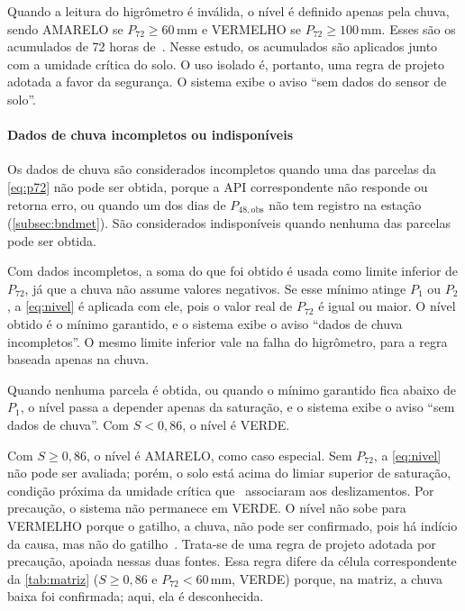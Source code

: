 Quando a leitura do higrômetro é inválida, o nível é definido apenas pela chuva, sendo AMARELO se $P_{72} \geq 60$\,mm e VERMELHO se
$P_{72} \geq 100$\,mm. Esses são os acumulados de 72 horas de~.
Nesse estudo, os acumulados são aplicados junto com a umidade crítica
do solo. O uso isolado é, portanto, uma regra de projeto adotada a
favor da segurança. O sistema exibe o aviso ``sem dados do sensor de
solo''.

\paragraph*{Dados de chuva incompletos ou indisponíveis}

Os dados de chuva são considerados incompletos quando uma das parcelas
da \autoref{eq:p72} não pode ser obtida, porque a API correspondente não
responde ou retorna erro, ou quando um dos dias de
$P_{48,\mathrm{obs}}$ não tem registro na estação
(\autoref{subsec:bndmet}). São considerados indisponíveis quando nenhuma
das parcelas pode ser obtida.

Com dados incompletos, a soma do que foi obtido é usada como limite
inferior de $P_{72}$, já que a chuva não assume valores negativos. Se
esse mínimo atinge $P_1$ ou $P_2$, a \autoref{eq:nivel} é aplicada com
ele, pois o valor real de $P_{72}$ é igual ou maior.
O nível obtido é o mínimo garantido, e o sistema exibe o aviso ``dados
de chuva incompletos''. O mesmo limite inferior vale na falha do
higrômetro, para a regra baseada apenas na chuva.

Quando nenhuma parcela é obtida, ou quando o mínimo garantido fica
abaixo de $P_1$, o nível passa a depender apenas da saturação, e o
sistema exibe o aviso ``sem dados de chuva''. Com $S < 0{,}86$, o
nível é VERDE.

Com $S \geq 0{,}86$, o nível é AMARELO, como caso especial. Sem
$P_{72}$, a \autoref{eq:nivel} não pode ser avaliada; porém, o solo
está acima do limiar superior de saturação, condição próxima da
umidade crítica que~
associaram aos deslizamentos. Por precaução, o sistema não permanece
em VERDE.
O nível não sobe para VERMELHO porque o gatilho, a chuva, não pode ser confirmado, pois há indício da causa, mas não do gatilho~\cite{bogaard2018hydrological}. Trata-se de uma regra de projeto
adotada por precaução, apoiada nessas duas fontes.
Essa regra difere da célula correspondente da \autoref{tab:matriz}
($S \geq 0{,}86$ e $P_{72} < 60$\,mm, VERDE) porque, na matriz, a
chuva baixa foi confirmada; aqui, ela é desconhecida.

